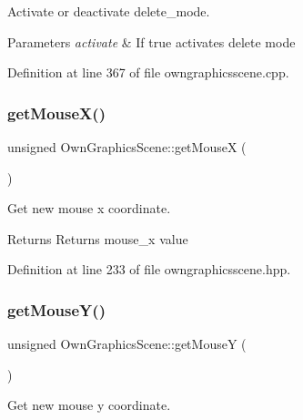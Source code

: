 Activate or deactivate delete\+\_\+mode. 


\begin{DoxyParams}{Parameters}
{\em activate} & If true activates delete mode \\
\hline
\end{DoxyParams}


Definition at line 367 of file owngraphicsscene.\+cpp.

\mbox{\label{classOwnGraphicsScene_a6e54bd43db758bcd4f7cc1dd4544232e}} 
\subsubsection{\texorpdfstring{get\+Mouse\+X()}{getMouseX()}}
{\footnotesize\ttfamily unsigned Own\+Graphics\+Scene\+::get\+MouseX (\begin{DoxyParamCaption}{ }\end{DoxyParamCaption})\hspace{0.3cm}{\ttfamily [inline]}}



Get new mouse x coordinate. 

\begin{DoxyReturn}{Returns}
Returns mouse\+\_\+x value 
\end{DoxyReturn}


Definition at line 233 of file owngraphicsscene.\+hpp.

\mbox{\label{classOwnGraphicsScene_a3fd2942e9930fc2dda41844622dc8a35}} 
\subsubsection{\texorpdfstring{get\+Mouse\+Y()}{getMouseY()}}
{\footnotesize\ttfamily unsigned Own\+Graphics\+Scene\+::get\+MouseY (\begin{DoxyParamCaption}{ }\end{DoxyParamCaption})\hspace{0.3cm}{\ttfamily [inline]}}



Get new mouse y coordinate. 

